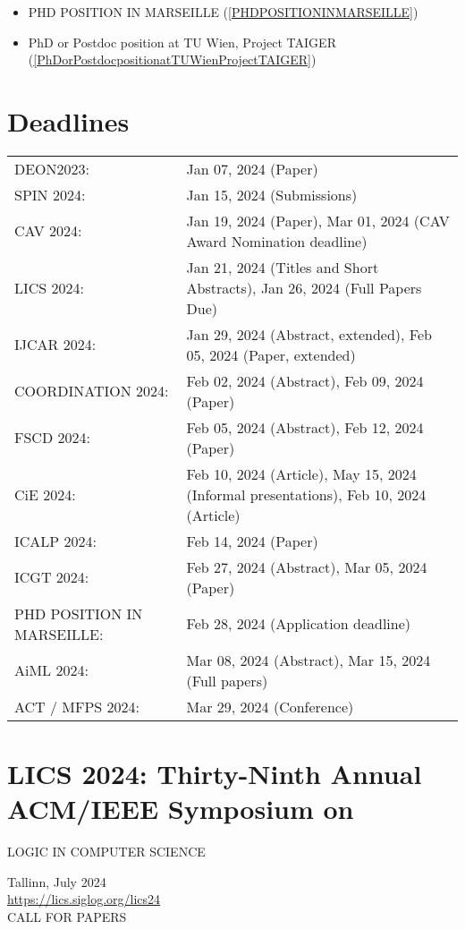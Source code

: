 \documentclass[prodmode,acmtecs]{acmsmall} %
\begin{document}
\begin{itemize}
\begin{itemize}\item PHD POSITION IN MARSEILLE (\cref{PHDPOSITIONINMARSEILLE})
\item PhD or Postdoc position at TU Wien, Project TAIGER (\cref{PhDorPostdocpositionatTUWienProjectTAIGER})
\end{itemize} 
\end{itemize}\section{Deadlines}\label{deadlines}\begin{tabulary}{\linewidth}{LL}DEON2023:  & Jan 07, 2024 (Paper) \\
SPIN 2024:  & Jan 15, 2024 (Submissions) \\
CAV 2024:  & Jan 19, 2024 (Paper), Mar 01, 2024 (CAV Award Nomination deadline) \\
LICS 2024:  & Jan 21, 2024 (Titles and Short Abstracts), Jan 26, 2024 (Full Papers Due) \\
IJCAR 2024:  & Jan 29, 2024 (Abstract, extended), Feb 05, 2024 (Paper, extended) \\
COORDINATION 2024:  & Feb 02, 2024 (Abstract), Feb 09, 2024 (Paper) \\
FSCD 2024:  & Feb 05, 2024 (Abstract), Feb 12, 2024 (Paper) \\
CiE 2024:  & Feb 10, 2024 (Article), May 15, 2024 (Informal presentations), Feb 10, 2024 (Article) \\
ICALP 2024:  & Feb 14, 2024 (Paper) \\
ICGT 2024:  & Feb 27, 2024 (Abstract), Mar 05, 2024 (Paper) \\
PHD POSITION IN MARSEILLE:  & Feb 28, 2024 (Application deadline) \\
AiML 2024:  & Mar 08, 2024 (Abstract), Mar 15, 2024 (Full papers) \\
ACT / MFPS 2024:  & Mar 29, 2024 (Conference) \\
\end{tabulary}
\section{LICS 2024: Thirty-Ninth Annual ACM/IEEE Symposium on}\label{LICS2024}LOGIC IN COMPUTER SCIENCE 

  Tallinn, July 2024\\ 
  \href{https://lics.siglog.org/lics24}{https://lics.siglog.org/lics24}\\ 
CALL FOR PAPERS 
\end{document}
